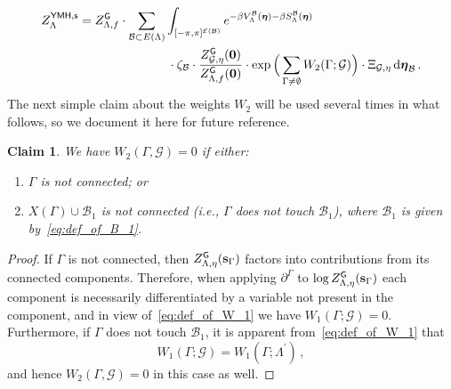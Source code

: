 \documentclass[11pt]{article}
\newtheorem{claim}[theorem]{Claim}
\theoremstyle{definition}
\theoremstyle{remark}
\numberwithin{theorem}{section}
\def\La{{\Lambda}}
\def\Ga{{\Gamma}}
\newcommand{\cE}{\mathcal{E}}
\newcommand{\cB}{\mathcal B}
\newcommand{\cG}{\mathcal G}
\begin{document}
    \begin{align}
        \label{eq:YMH_partition_function_second_reduction}
        Z_{\Lambda}^{\sf YMH,s}  &= Z_{\Lambda,f}^{\sf G} \cdot \sum_{\mathcal{B}\subset E(\Lambda)} \int_{[-\pi,\pi]^{\cE(\mathcal{B})}} e^{-\beta V_{\Lambda}^{\mathcal{B}}(\boldsymbol{\eta})- \beta S_{\Lambda}^{\mathcal{B}}(\boldsymbol{\eta})} \notag \\
        &\hskip1in \cdot \zeta_{\mathcal{B}} \cdot \frac{Z_{\mathcal{G},\eta}^{\sf G}(\mathbf{0})}{Z_{\Lambda,f}^{\sf G}(\mathbf{0})} \cdot \exp\Big( \sum_{\Ga\not=\emptyset} W_2(\Ga;\mathcal{G}) \Big) \cdot \Xi_{\mathcal{G},\eta}\,  {\rm d}\boldsymbol{\eta}_{\mathcal{B}} \, .
    \end{align}
    The next simple claim about the weights $W_2$ will be used several times in what follows, so we document it here for future reference. 
    \begin{claim}
        \label{claim:condition_for_which_W_2_non_zero}
        We have $W_2(\Ga,\cG) = 0$ if either:
        \begin{enumerate}
            \item $\Ga$ is not connected; or
            \item $X(\Ga) \cup \cB_1$ is not connected (i.e., $\Ga$ does not touch $\cB_1$), where $\cB_1$ is given by~\eqref{eq:def_of_B_1}. 
        \end{enumerate}
    \end{claim}
    \begin{proof}
        If $\Ga$ is not connected, then $Z_{\Lambda,\eta}^{\sf G}(\mathbf{s}_\Ga)$ factors into contributions from its connected components. Therefore, when applying $\partial^\Ga$ to $\log Z_{\Lambda,\eta}^{\sf G}(\mathbf{s}_\Ga)$ each component is necessarily differentiated by a variable not present in the component, and in view of~\eqref{eq:def_of_W_1} we have $W_1(\Ga;\cG) = 0$. Furthermore, if $\Ga$ does not touch $\cB_1$, it is apparent from~\eqref{eq:def_of_W_1} that
        \[
        W_1(\Ga; \cG) = W_1(\Ga; \La^\prime) \, ,
        \]
        and hence $W_2(\Gamma,\cG) = 0$ in this case as well.
    \end{proof}
\end{document}
